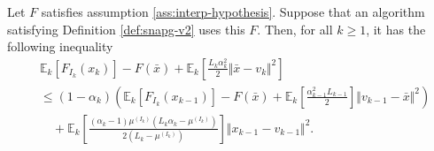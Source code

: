 \documentclass[12pt]{article}
\begin{document}
        \begin{theorem}\label{thm:snapg2-one-step}
            Let $F$ satisfies assumption \ref{ass:interp-hypothesis}. 
            Suppose that an algorithm satisfying Definition \ref{def:snapg-v2} uses this $F$. 
            Then, for all $k \ge 1$, it has the following inequality 
            \begin{align*}
                & \mathbb E_k\left[F_{I_k}(x_{k})\right] 
                - F(\bar x) 
                + \mathbb E_k\left[
                    \frac{L_k\alpha_k^2}{2}\Vert \bar x - v_k\Vert^2 
                \right]
                \\
                &\le 
                (1 - \alpha_k)\left(
                        \mathbb E_k \left[F_{I_k}(x_{k - 1})\right] 
                        - F(\bar x)
                        + \mathbb E_k \left[\frac{\alpha_{k - 1}^2L_{k - 1}}{2}\right]\Vert v_{k - 1} - \bar x\Vert^2
                \right)
                    \\ &\quad 
                    + \mathbb E_k\left[
                        \frac{(\alpha_k - 1)\mu^{(I_k)}\left(L_k\alpha_k - \mu^{(I_k)}\right)}{2\left(L_k - \mu^{(I_k)}\right)}
                    \right]\Vert x_{k - 1} - v_{k - 1} \Vert^2. 
            \end{align*}
        \end{theorem}
\end{document}
